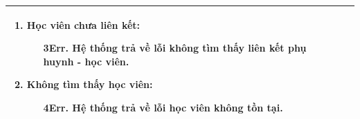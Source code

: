 {\begin{tabularx}{\textwidth}{|>{\raggedright\arraybackslash}X|>{\raggedright\arraybackslash}X|}
\begin{enumerate}
    \item \textbf{Học viên chưa liên kết:}
    \begin{enumerate}
        \item[3Err.] Hệ thống trả về lỗi không tìm thấy liên kết phụ huynh - học viên.
    \end{enumerate}
    \item \textbf{Không tìm thấy học viên:}
    \begin{enumerate}
        \item[4Err.] Hệ thống trả về lỗi học viên không tồn tại.
    \end{enumerate}
\end{enumerate} \\
\hline
\end{tabularx}
}
